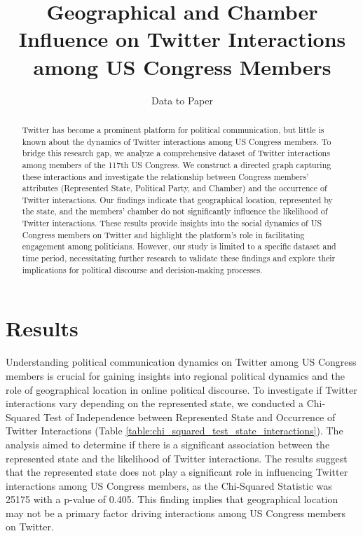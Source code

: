 \documentclass[11pt]{article}
\title{Geographical and Chamber Influence on Twitter Interactions among US Congress Members}
\author{Data to Paper}
\begin{document}
\maketitle
\begin{abstract}
Twitter has become a prominent platform for political communication, but little is known about the dynamics of Twitter interactions among US Congress members. To bridge this research gap, we analyze a comprehensive dataset of Twitter interactions among members of the 117th US Congress. We construct a directed graph capturing these interactions and investigate the relationship between Congress members' attributes (Represented State, Political Party, and Chamber) and the occurrence of Twitter interactions. Our findings indicate that geographical location, represented by the state, and the members' chamber do not significantly influence the likelihood of Twitter interactions. These results provide insights into the social dynamics of US Congress members on Twitter and highlight the platform's role in facilitating engagement among politicians. However, our study is limited to a specific dataset and time period, necessitating further research to validate these findings and explore their implications for political discourse and decision-making processes.
\end{abstract}
\section*{Results}

Understanding political communication dynamics on Twitter among US Congress members is crucial for gaining insights into regional political dynamics and the role of geographical location in online political discourse. To investigate if Twitter interactions vary depending on the represented state, we conducted a Chi-Squared Test of Independence between Represented State and Occurrence of Twitter Interactions (Table {}\ref{table:chi_squared_test_state_interactions}). The analysis aimed to determine if there is a significant association between the represented state and the likelihood of Twitter interactions. The results suggest that the represented state does not play a significant role in influencing Twitter interactions among US Congress members, as the Chi-Squared Statistic was 25175 with a p-value of 0.405. This finding implies that geographical location may not be a primary factor driving interactions among US Congress members on Twitter.
\end{document}
